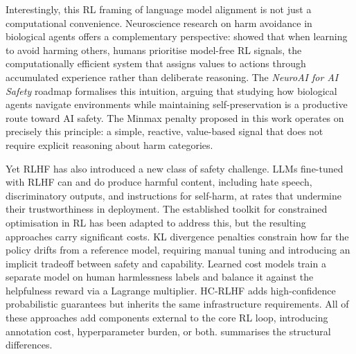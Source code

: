 \documentclass[a4paper,twoside,12pt]{report}
\begin{document}
Interestingly, this RL framing of language model alignment is not just a computational
convenience. Neuroscience research on harm avoidance in biological agents offers a
complementary perspective: \citet{lockwood2020model} showed that when learning to avoid
harming others, humans prioritise model-free RL signals, the computationally efficient
system that assigns values to actions through accumulated experience rather than deliberate
reasoning. The \emph{NeuroAI for AI Safety} roadmap \citep{neuroai2024safety} formalises
this intuition, arguing that studying how biological agents navigate environments while
maintaining self-preservation is a productive route toward AI safety. The Minmax penalty
proposed in this work operates on precisely this principle: a simple, reactive, value-based
signal that does not require explicit reasoning about harm categories.

Yet RLHF has also introduced a new class of safety challenge. LLMs fine-tuned with RLHF can
and do produce harmful content, including hate speech, discriminatory outputs, and
instructions for self-harm, at rates that undermine their trustworthiness in deployment. The
established toolkit for constrained optimisation in RL \citep{garcia2015comprehensive,
achiam2017cpo} has been adapted to address this, but the resulting approaches carry
significant costs. KL divergence penalties constrain how far the policy drifts from a
reference model, requiring manual tuning and introducing an implicit tradeoff between safety
and capability. Learned cost models \citep{dai2024saferlhf} train a separate model on human
harmlessness labels and balance it against the helpfulness reward via a Lagrange multiplier.
HC-RLHF \citep{chittepu2025} adds high-confidence probabilistic guarantees but inherits the
same infrastructure requirements. All of these approaches add components external to the core
RL loop, introducing annotation cost, hyperparameter burden, or both.
 summarises the structural differences.
\end{document}
